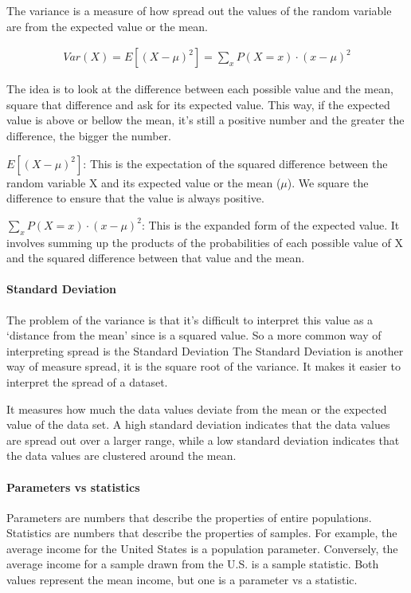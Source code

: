 \documentclass[11pt]{article}
\begin{document}
The variance is a measure of how spread out the values of the random
variable are from the expected value or the mean.

\begin{gather}
  Var(X) = E[(X- \mu)^2] = \sum_x P(X=x) \cdot (x - \mu)^2 
\end{gather}
  


The idea is to look at the difference between each possible value and
the mean, square that difference and ask for its expected value. This
way, if the expected value is above or bellow the mean, it's still a
positive number and the greater the difference, the bigger the number.

\(E[(X - \mu)^2]\): This is the expectation of the squared difference
between the random variable X and its expected value or the mean
(\(\mu\)). We square the difference to ensure that the value is always
positive.

\(\sum_x P(X=x) \cdot (x - \mu)^2\): This is the expanded form of the
expected value. It involves summing up the products of the probabilities
of each possible value of X and the squared difference between that
value and the mean.


\hypertarget{standard-deviation}{%
\paragraph{Standard Deviation}\label{standard-deviation}}

The problem of the variance is that it's difficult to interpret this
value as a `distance from the mean' since is a squared value. So a more
common way of interpreting spread is the Standard Deviation The Standard
Deviation is another way of measure spread, it is the square root of the
variance. It makes it easier to interpret the spread of a dataset.

It measures how much the data values deviate from the mean or the
expected value of the data set. A high standard deviation indicates that
the data values are spread out over a larger range, while a low standard
deviation indicates that the data values are clustered around the mean.

\hypertarget{Parameters vs Statistics}{%
\paragraph*{Parameters vs statistics}\label{parameters-vs-statistics}}
Parameters are numbers that describe the properties of
entire populations. Statistics are numbers that describe the properties
of samples. For example, the average income for the United States is a
population parameter. Conversely, the average income for a sample drawn
from the U.S. is a sample statistic. Both values represent the mean
income, but one is a parameter vs a statistic.
\end{document}
